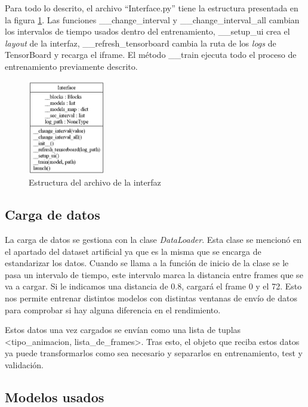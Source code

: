 Para todo lo descrito, el archivo ``Interface.py'' tiene la estructura presentada en la figura \ref{fig:interfaz-estructura}. Las funciones \_\_change\_interval y \_\_change\_interval\_all cambian los intervalos de tiempo usados dentro del entrenamiento, \_\_setup\_ui crea el \textit{layout} de la interfaz, \_\_refresh\_tensorboard cambia la ruta de los \textit{logs} de TensorBoard y recarga el \gls{iframe}. El método \_\_train ejecuta todo el proceso de entrenamiento previamente descrito.

\begin{figure}[h!]
    \centering
    \includegraphics[width=0.3\textwidth]{Imagenes/Bitmap/classes_Interface.png}
    \caption{Estructura del archivo de la interfaz}
    \label{fig:interfaz-estructura}
\end{figure}

\subsection{Carga de datos}

La carga de datos se gestiona con la clase \textit{DataLoader}. Esta clase se mencionó en el apartado del dataset artificial ya que es la misma que se encarga de estandarizar los datos. Cuando se llama a la función de inicio de la clase se le pasa un intervalo de tiempo, este intervalo marca la distancia entre frames que se va a cargar. Si le indicamos una distancia de 0.8, cargará el frame 0 y el 72. Esto nos permite entrenar distintos modelos con distintas ventanas de envío de datos para comprobar si hay alguna diferencia en el rendimiento.

Estos datos una vez cargados se envían como una lista de tuplas <tipo\_animacion, lista\_de\_frames>. Tras esto, el objeto que reciba estos datos ya puede transformarlos como sea necesario y separarlos en entrenamiento, test y validación.

\subsection{Modelos usados}

